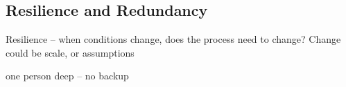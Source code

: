 \subsection{Resilience and Redundancy}

Resilience -- when conditions change, does the process need to change? Change could be scale, or assumptions

one person deep -- no backup